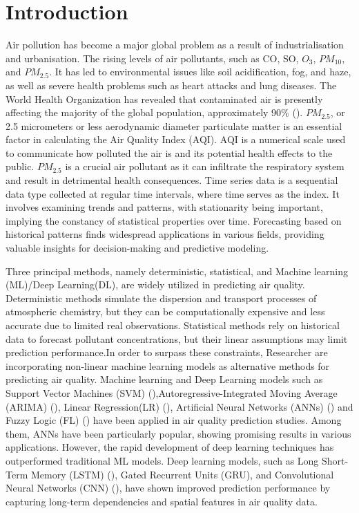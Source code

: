 \documentclass[a4paper,fleqn]{cas-sc}
\begin{document}
\section{Introduction}
Air pollution has become a major global problem as a result of industrialisation and urbanisation. The rising levels of air pollutants, such as CO, SO, $O_3$, $PM_{10}$, and $PM_{2.5}$. It has led to environmental issues like soil acidification, fog, and haze, as well as severe health problems such as heart attacks and lung diseases. The World Health Organization has revealed that contaminated air is presently affecting the majority of the global population, approximately 90\% (\cite{zhou2019effects}). $PM_{2.5}$, or 2.5 micrometers or less aerodynamic diameter particulate matter is an essential factor in calculating the Air Quality Index (AQI). AQI is a numerical scale used to communicate how polluted the air is and its potential health effects to the public. $PM_{2.5}$ is a crucial air pollutant as it can infiltrate the respiratory system and result in detrimental health consequences. Time series data is a sequential data type collected at regular time intervals, where time serves as the index. It involves examining trends and patterns, with stationarity being important, implying the constancy of statistical properties over time. Forecasting based on historical patterns finds widespread applications in various fields, providing valuable insights for decision-making and predictive modeling.

Three principal methods, namely deterministic, statistical, and Machine learning (ML)/Deep Learning(DL), are widely utilized in predicting air quality. Deterministic methods simulate the dispersion and transport processes of atmospheric chemistry, but they can be computationally expensive and less accurate due to limited real observations. Statistical methods rely on historical data to forecast pollutant concentrations, but their linear assumptions may limit prediction performance.In order to surpass these constraints, Researcher are incorporating non-linear machine learning models as alternative methods for predicting air quality. Machine learning and Deep Learning models such as Support Vector Machines (SVM) (\cite{lin2011forecasting}),Autoregressive-Integrated Moving Average (ARIMA) (\cite{kumari2022machine}), Linear Regression(LR) (\cite{kumari2022deep}), Artificial Neural Networks (ANNs) (\cite{taylan2017modelling}) and Fuzzy Logic (FL) (\cite{wang2015model}) have been applied in air quality prediction studies. Among them, ANNs have been particularly popular, showing promising results in various applications. However, the rapid development of deep learning techniques has outperformed traditional ML models. Deep learning models, such as Long Short-Term Memory (LSTM) (\cite{kristiani2022short}), Gated Recurrent Units (GRU), and Convolutional Neural Networks (CNN) (\cite{ayturan2018air}), have shown improved prediction performance by capturing long-term dependencies and spatial features in air quality data.
\end{document}
